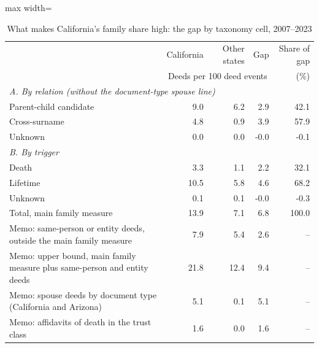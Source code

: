 \begin{table}[!t]\centering
\caption{What makes California's family share high: the gap by taxonomy cell, 2007--2023}
\label{tab:decomp}
{\small\setlength{\tabcolsep}{5pt}
\begin{adjustbox}{max width=\textwidth}\begin{tabular}{lrrrr}\toprule
 & California & Other states & Gap & Share of gap \\
 & \multicolumn{3}{c}{Deeds per 100 deed events} & (\%) \\
\midrule
\multicolumn{5}{l}{\emph{A. By relation (without the document-type spouse line)}} \\
\quad Parent-child candidate & 9.0 & 6.2 & 2.9 & 42.1 \\
\quad Cross-surname & 4.8 & 0.9 & 3.9 & 57.9 \\
\quad Unknown & 0.0 & 0.0 & -0.0 & -0.1 \\
\multicolumn{5}{l}{\emph{B. By trigger}} \\
\quad Death & 3.3 & 1.1 & 2.2 & 32.1 \\
\quad Lifetime & 10.5 & 5.8 & 4.6 & 68.2 \\
\quad Unknown & 0.1 & 0.1 & -0.0 & -0.3 \\
\midrule
Total, main family measure & 13.9 & 7.1 & 6.8 & 100.0 \\
\addlinespace
Memo: same-person or entity deeds, outside the main family measure & 7.9 & 5.4 & 2.6 & -- \\
Memo: upper bound, main family measure plus same-person and entity deeds & 21.8 & 12.4 & 9.4 & -- \\
Memo: spouse deeds by document type (California and Arizona) & 5.1 & 0.1 & 5.1 & -- \\
Memo: affidavits of death in the trust class & 1.6 & 0.0 & 1.6 & -- \\
\bottomrule\end{tabular}\end{adjustbox}}
\begin{minipage}{0.92\textwidth}\end{minipage}
\end{table}
